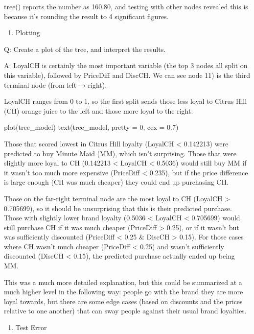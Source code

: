 \documentclass[
]{book}
\providecommand{\tightlist}{%
  \setlength{\itemsep}{0pt}\setlength{\parskip}{0pt}}
\begin{document}
tree() reports the number as 160.80, and testing with other nodes revealed this is because it's rounding the result to 4 significant figures.

\begin{enumerate}
\def\labelenumi{(\alph{enumi})}
\setcounter{enumi}{3}
\tightlist
\item
  Plotting
\end{enumerate}

Q: Create a plot of the tree, and interpret the results.

A:
LoyalCH is certainly the most important variable (the top 3 nodes all split on this variable), followed by PriceDiff and DiscCH. We can see node 11) is the third terminal node (from left → right).

LoyalCH ranges from 0 to 1, so the first split sends those less loyal to Citrus Hill (CH) orange juice to the left and those more loyal to the right:

plot(tree\_model)
text(tree\_model, pretty = 0, cex = 0.7)

Those that scored lowest in Citrus Hill loyalty (LoyalCH \textless{} 0.142213) were predicted to buy Minute Maid (MM), which isn't surprising. Those that were slightly more loyal to CH (0.142213 \textless{} LoyalCH \textless{} 0.5036) would still buy MM if it wasn't too much more expensive (PriceDiff \textless{} 0.235), but if the price difference is large enough (CH was much cheaper) they could end up purchasing CH.

Those on the far-right terminal node are the most loyal to CH (LoyalCH \textgreater{} 0.705699), so it should be unsurprising that this is their predicted purchase. Those with slightly lower brand loyalty (0.5036 \textless{} LoyalCH \textless{} 0.705699) would still purchase CH if it was much cheaper (PriceDiff \textgreater{} 0.25), or if it wasn't but was sufficiently discounted (PriceDiff \textless{} 0.25 \& DiscCH \textgreater{} 0.15). For those cases where CH wasn't much cheaper (PriceDiff \textless{} 0.25) and wasn't sufficiently discounted (DiscCH \textless{} 0.15), the predicted purchase actually ended up being MM.

This was a much more detailed explanation, but this could be summarized at a much higher level in the following way: people go with the brand they are more loyal towards, but there are some edge cases (based on discounts and the prices relative to one another) that can sway people against their usual brand loyalties.

\begin{enumerate}
\def\labelenumi{(\alph{enumi})}
\setcounter{enumi}{4}
\tightlist
\item
  Test Error
\end{enumerate}
\end{document}
